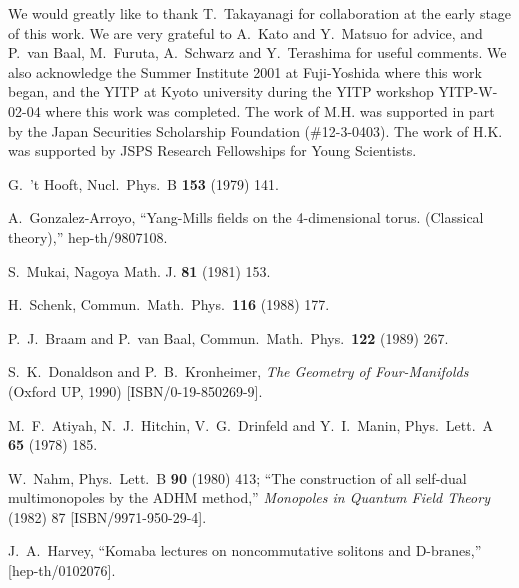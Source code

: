 \documentclass[a4paper,epsf,12pt]{article}
\begin{document}
We would greatly like to thank T.~Takayanagi
for collaboration at the early stage of this work.
We are very grateful to A.~Kato and Y.~Matsuo 
for advice,
and P.~van Baal, M.~Furuta, A.~Schwarz and Y.~Terashima
for useful comments. 
We also acknowledge the Summer Institute
2001 at Fuji-Yoshida where this work began,
and the YITP at Kyoto university during the YITP workshop YITP-W-02-04
where this work was completed.
The work of M.H. was supported in part by
the Japan Securities Scholarship Foundation (\#12-3-0403).
The work of H.K. was supported 
by JSPS Research Fellowships for Young
Scientists.

\appendix

\begin{thebibliography}{99}

G.~'t Hooft,
Nucl.\ Phys.\ B {\bf 153} (1979) 141.

A.~Gonzalez-Arroyo,
``Yang-Mills fields on the 4-dimensional torus. (Classical theory),''
hep-th/9807108.

S.~Mukai,
Nagoya Math. J. {\bf 81} (1981) 153.

H.~Schenk,
Commun.\ Math.\ Phys.\  {\bf 116} (1988) 177.

P.~J.~Braam and P.~van Baal,
Commun.\ Math.\ Phys.\  {\bf 122} (1989) 267.

S.~K.~Donaldson and P.~B.~Kronheimer, 
{\it The Geometry of Four-Manifolds} 
(Oxford UP, 1990) 
[ISBN/0-19-850269-9].

M.~F.~Atiyah, N.~J.~Hitchin, V.~G.~Drinfeld and Y.~I.~Manin,
Phys.\ Lett.\ A {\bf 65} (1978) 185.

W.~Nahm,
Phys.\ Lett.\ B {\bf 90} (1980) 413;
``The construction of all self-dual multimonopoles by the ADHM method,''
{\it Monopoles in Quantum Field Theory}
(1982) 87 [ISBN/9971-950-29-4].

J.~A.~Harvey,
``Komaba lectures on noncommutative solitons and D-branes,''
[hep-th/0102076].


\end{thebibliography}
\end{document}

